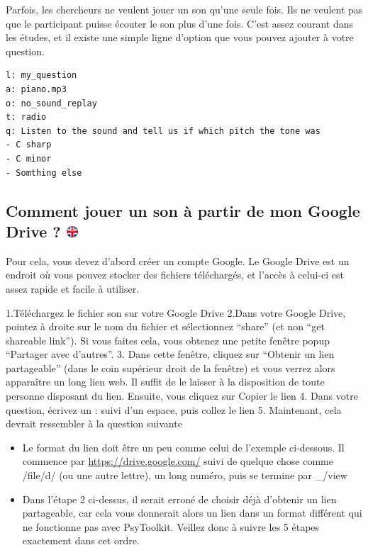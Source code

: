 \documentclass[
]{book}
\providecommand{\tightlist}{%
  \setlength{\itemsep}{0pt}\setlength{\parskip}{0pt}}
\begin{document}
Parfois, les chercheurs ne veulent jouer un son qu'une seule fois. Ils ne veulent pas que le participant puisse écouter le son plus d'une fois. C'est assez courant dans les études, et il existe une simple ligne d'option que vous pouvez ajouter à votre question.

\begin{verbatim}
l: my_question
a: piano.mp3
o: no_sound_replay
t: radio
q: Listen to the sound and tell us if which pitch the tone was
- C sharp
- C minor
- Somthing else
\end{verbatim}

\hypertarget{comment-jouer-un-son-uxe0-partir-de-mon-google-drive}{%
\subsection[Comment jouer un son à partir de mon Google Drive ? ]{\texorpdfstring{Comment jouer un son à partir de mon Google Drive ? \href{https://www.psytoolkit.org/lessons/surveyaudiovideo.html\#_how_to_play_a_sound_from_my_google_drive}{\protect\includegraphics{img/ukflag.png}}}{Comment jouer un son à partir de mon Google Drive ? }}\label{comment-jouer-un-son-uxe0-partir-de-mon-google-drive}}

Pour cela, vous devez d'abord créer un compte Google. Le Google Drive est un endroit où vous pouvez stocker des fichiers téléchargés, et l'accès à celui-ci est assez rapide et facile à utiliser.

1.Téléchargez le fichier son sur votre Google Drive
2.Dans votre Google Drive, pointez à droite sur le nom du fichier et sélectionnez ``share'' (et non ``get shareable link''). Si vous faites cela, vous obtenez une petite fenêtre popup ``Partager avec d'autres''.
3. Dans cette fenêtre, cliquez sur ``Obtenir un lien partageable'' (dans le coin supérieur droit de la fenêtre) et vous verrez alors apparaître un long lien web. Il suffit de le laisser à la disposition de toute personne disposant du lien. Ensuite, vous cliquez sur Copier le lien
4. Dans votre question, écrivez un : suivi d'un espace, puis collez le lien
5. Maintenant, cela devrait ressembler à la question suivante

\begin{itemize}
\tightlist
\item
  Le format du lien doit être un peu comme celui de l'exemple ci-dessous. Il commence par \url{https://drive.google.com/} suivi de quelque chose comme /file/d/ (ou une autre lettre), un long numéro, puis se termine par \_/view
\item
  Dans l'étape 2 ci-dessus, il serait erroné de choisir déjà d'obtenir un lien partageable, car cela vous donnerait alors un lien dans un format différent qui ne fonctionne pas avec PsyToolkit. Veillez donc à suivre les 5 étapes exactement dans cet ordre.
\end{itemize}
\end{document}
